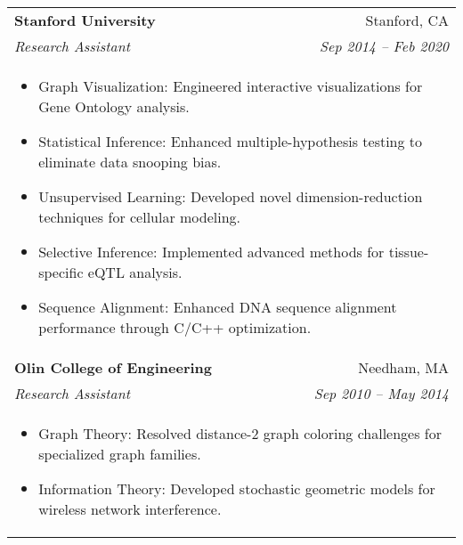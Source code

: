 \documentclass[letterpaper,11pt]{article}
\begin{document}
\begin{tabular*}{0.97\textwidth}[t]{l@{\extracolsep{\fill}}r}
  \textbf{Stanford University} & Stanford, CA \\
  \textit{\small Research Assistant} & \textit{\small Sep 2014 -- Feb 2020} \\
  \multicolumn{2}{l}{
    \begin{minipage}{\textwidth}
      \vspace{0.3em}
      \begin{itemize}[leftmargin=*, itemsep=-4.5pt, topsep=0pt, label={\raisebox{0.4ex}{\tiny\textbullet}}]
        \item  Graph Visualization: Engineered interactive visualizations for Gene Ontology analysis.
        \item  Statistical Inference: Enhanced multiple-hypothesis testing to eliminate data snooping bias.
        \item  Unsupervised Learning: Developed novel dimension-reduction techniques for cellular modeling.
        \item  Selective Inference: Implemented advanced methods for tissue-specific eQTL analysis.
        \item  Sequence Alignment: Enhanced DNA sequence alignment performance through C/C++ optimization.
      \end{itemize}
    \end{minipage}
  } \\
  \noalign{\vspace{0.7em}}

  \textbf{Olin College of Engineering} & Needham, MA \\
  \textit{\small Research Assistant} & \textit{\small Sep 2010 -- May 2014} \\
  \multicolumn{2}{l}{
    \begin{minipage}{\textwidth}
      \vspace{0.3em}
      \begin{itemize}[leftmargin=*, itemsep=-4.5pt, topsep=0pt, label={\raisebox{0.4ex}{\tiny\textbullet}}]
        \item  Graph Theory: Resolved distance-2 graph coloring challenges for specialized graph families.
        \item  Information Theory: Developed stochastic geometric models for wireless network interference.
      \end{itemize}
    \end{minipage}
  } \\
\end{tabular*}

\end{document}
